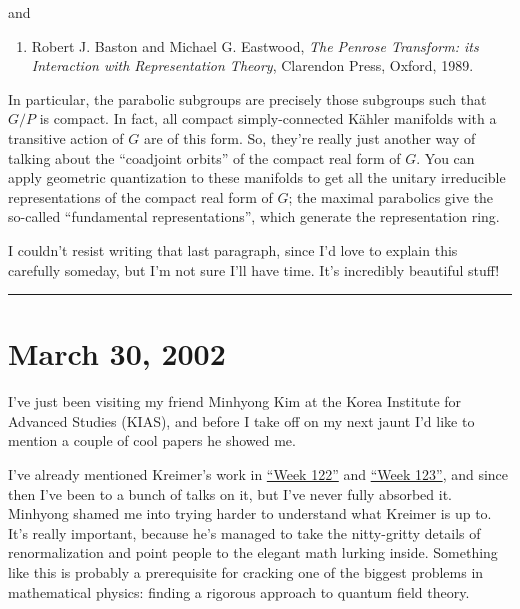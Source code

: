 \documentclass{article}
\def\tightlist{}
\renewcommand{\texttt}[1]{%
  \begingroup
  \ttfamily
  \begingroup\lccode`~=`/\lowercase{\endgroup\def~}{/\discretionary{}{}{}}%
  \begingroup\lccode`~=`[\lowercase{\endgroup\def~}{[\discretionary{}{}{}}%
  \begingroup\lccode`~=`.\lowercase{\endgroup\def~}{.\discretionary{}{}{}}%
  \catcode`/=\active\catcode`[=\active\catcode`.=\active
  \scantokens{#1\noexpand}%
  \endgroup
}
\begin{document}
and

\begin{enumerate}
\def\labelenumi{\arabic{enumi})}
\setcounter{enumi}{8}
\tightlist
\item
  Robert J. Baston and Michael G. Eastwood, \emph{The Penrose Transform:
  its Interaction with Representation Theory}, Clarendon Press, Oxford,
  1989.
\end{enumerate}

In particular, the parabolic subgroups are precisely those subgroups
such that \(G/P\) is compact. In fact, all compact simply-connected
Kähler manifolds with a transitive action of \(G\) are of this form. So,
they're really just another way of talking about the ``coadjoint
orbits'' of the compact real form of \(G\). You can apply geometric
quantization to these manifolds to get all the unitary irreducible
representations of the compact real form of \(G\); the maximal
parabolics give the so-called ``fundamental representations'', which
generate the representation ring.

I couldn't resist writing that last paragraph, since I'd love to explain
this carefully someday, but I'm not sure I'll have time. It's incredibly
beautiful stuff!

\begin{center}\rule{0.5\linewidth}{0.5pt}\end{center}



\hypertarget{week179}{%
\section{March 30, 2002}\label{week179}}

I've just been visiting my friend Minhyong Kim at the Korea Institute
for Advanced Studies (KIAS), and before I take off on my next jaunt I'd
like to mention a couple of cool papers he showed me.


I've already mentioned Kreimer's work in
\protect\hyperlink{week122}{``Week 122''} and
\protect\hyperlink{week123}{``Week 123''}, and since then I've been to a
bunch of talks on it, but I've never fully absorbed it. Minhyong shamed
me into trying harder to understand what Kreimer is up to. It's really
important, because he's managed to take the nitty-gritty details of
renormalization and point people to the elegant math lurking inside.
Something like this is probably a prerequisite for cracking one of the
biggest problems in mathematical physics: finding a rigorous approach to
quantum field theory.
\end{document}
